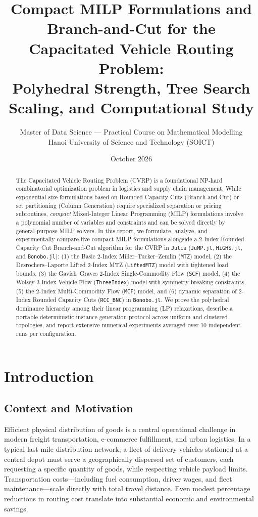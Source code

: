 \documentclass[11pt,a4paper]{article}
\title{\textbf{Compact MILP Formulations and Branch-and-Cut for the Capacitated Vehicle Routing Problem:\\Polyhedral Strength, Tree Search Scaling, and Computational Study}}
\author{Master of Data Science --- Practical Course on Mathematical Modelling\\Hanoi University of Science and Technology (SOICT)}
\date{October 2026}
\begin{document}
\maketitle

\begin{abstract}
The Capacitated Vehicle Routing Problem (CVRP) is a foundational NP-hard combinatorial optimization problem in logistics and supply chain management. While exponential-size formulations based on Rounded Capacity Cuts (Branch-and-Cut) or set partitioning (Column Generation) require specialized separation or pricing subroutines, \emph{compact} Mixed-Integer Linear Programming (MILP) formulations involve a polynomial number of variables and constraints and can be solved directly by general-purpose MILP solvers. In this report, we formulate, analyze, and experimentally compare five compact MILP formulations alongside a 2-Index Rounded Capacity Cut Branch-and-Cut algorithm for the CVRP in \texttt{Julia} (\texttt{JuMP.jl}, \texttt{HiGHS.jl}, and \texttt{Bonobo.jl}): (1) the Basic 2-Index Miller--Tucker--Zemlin (\texttt{MTZ}) model, (2) the Desrochers--Laporte Lifted 2-Index MTZ (\texttt{LiftedMTZ}) model with tightened load bounds, (3) the Gavish--Graves 2-Index Single-Commodity Flow (\texttt{SCF}) model, (4) the Wolsey 3-Index Vehicle-Flow (\texttt{ThreeIndex}) model with symmetry-breaking constraints, (5) the 2-Index Multi-Commodity Flow (\texttt{MCF}) model, and (6) dynamic separation of 2-Index Rounded Capacity Cuts (\texttt{RCC\_BNC}) in \texttt{Bonobo.jl}. We prove the polyhedral dominance hierarchy among their linear programming (LP) relaxations, describe a portable deterministic instance generation protocol across uniform and clustered topologies, and report extensive numerical experiments averaged over 10 independent runs per configuration.
\end{abstract}

\section{Introduction}

\subsection{Context and Motivation}
Efficient physical distribution of goods is a central operational challenge in modern freight transportation, e-commerce fulfillment, and urban logistics. In a typical last-mile distribution network, a fleet of delivery vehicles stationed at a central depot must serve a geographically dispersed set of customers, each requesting a specific quantity of goods, while respecting vehicle payload limits. Transportation costs---including fuel consumption, driver wages, and fleet maintenance---scale directly with total travel distance. Even modest percentage reductions in routing cost translate into substantial economic and environmental savings.
\end{document}
